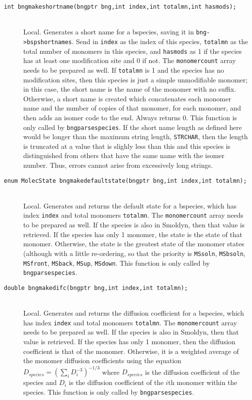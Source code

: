 \documentclass {book}
\begin{document}
\begin{description}
\item[\texttt{int bngmakeshortname(bngptr bng,int index,int totalmn,int hasmods);}]
\hfill \\
Local. Generates a short name for a bspecies, saving it in \texttt{bng->bspshortnames}. Send in \texttt{index} as the index of this species, \texttt{totalmn} as the total number of monomers in this species, and \texttt{hasmods} as 1 if the species has at least one modification site and 0 if not. The \texttt{monomercount} array needs to be prepared as well. If \texttt{totalmn} is 1 and the species has no modification sites, then this species is just a simple unmodifiable monomer; in this case, the short name is the name of the monomer with no suffix. Otherwise, a short name is created which concatenates each monomer name and the number of copies of that monomer, for each monomer, and then adds an isomer code to the end. Always returns 0. This function is only called by \texttt{bngparsespecies}. If the short name length as defined here would be longer than the maximum string length, \texttt{STRCHAR}, then the length is truncated at a value that is slighly less than this and this species is distinguished from others that have the same name with the isomer number. Thus, errors cannot arise from excessively long strings.

\item[\texttt{enum MolecState bngmakedefaultstate(bngptr bng,int index,int totalmn);}]
\hfill \\
Local. Generates and returns the default state for a bspecies, which has index \texttt{index} and total monomers \texttt{totalmn}. The \texttt{monomercount} array needs to be prepared as well. If the species is also in Smoldyn, then that value is retrieved. If the species has only 1 monomer, the state is the state of that monomer. Otherwise, the state is the greatest state of the monomer states (although with a little re-ordering, so that the priority is \texttt{MSsoln}, \texttt{MSbsoln}, \texttt{MSfront}, \texttt{MSback}, \texttt{MSup}, \texttt{MSdown}. This function is only called by \texttt{bngparsespecies}.

\item[\texttt{double bngmakedifc(bngptr bng,int index,int totalmn);}]
\hfill \\
Local. Generates and returns the diffusion coefficient for a bspecies, which has index \texttt{index} and total monomers \texttt{totalmn}. The \texttt{monomercount} array needs to be prepared as well. If the species is also in Smoldyn, then that value is retrieved. If the species has only 1 monomer, then the diffusion coefficient is that of the monomer. Otherwise, it is a weighted average of the monomer diffusion coefficients using the equation
$D_{species} = (\sum_{i} D_i^{-3})^{-1/3}$
where $D_{species}$ is the diffusion coefficient of the species and $D_i$ is the diffusion coefficient of the $i$th monomer within the species. This function is only called by \texttt{bngparsespecies}.


\end{description}
\end{document}
